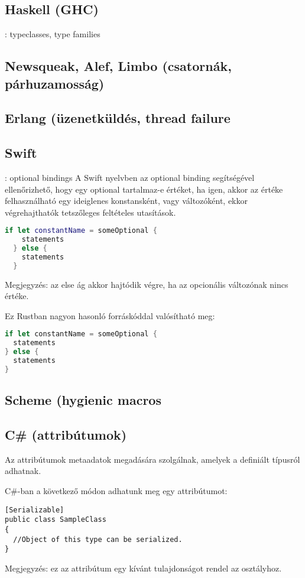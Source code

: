 \subsection{Haskell (GHC)}: typeclasses, type families

\subsection{Newsqueak, Alef, Limbo (csatornák, párhuzamosság)}

\subsection{Erlang (üzenetküldés, thread failure}

\subsection{Swift}: optional bindings
A Swift nyelvben az optional binding segítségével ellenőrizhető, hogy egy optional tartalmaz-e értéket, ha igen, akkor az értéke felhasználható egy ideiglenes konstansként, vagy változóként, ekkor végrehajthatók tetszőleges feltételes utasítások. %
\begin{lstlisting}[language=Swift]
  if let constantName = someOptional {
    statements
  } else {
    statements
  }
\end{lstlisting}
Megjegyzés: az else ág akkor hajtódik végre, ha az opcionális változónak nincs értéke.

Ez Rustban nagyon hasonló forráskóddal valósítható meg:
\begin{lstlisting}[language=Rust, style=boxed, style=colouredRust]
if let constantName = someOptional {
  statements
} else {
  statements
}
\end{lstlisting}

\subsection{Scheme (hygienic macros}

\subsection{C\# (attribútumok)}

Az attribútumok metaadatok megadására szolgálnak, amelyek a definiált típusról adhatnak.

C\#-ban a következő módon adhatunk meg egy attribútumot:
\begin{lstlisting}
[Serializable]
public class SampleClass
{
  //Object of this type can be serialized.
}
\end{lstlisting}
Megjegyzés: ez az attribútum egy kívánt tulajdonságot rendel az osztályhoz.

